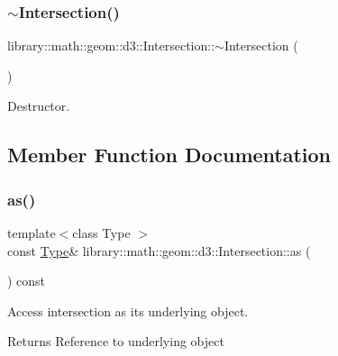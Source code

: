 \subsubsection{\texorpdfstring{$\sim$\+Intersection()}{~Intersection()}}
{\footnotesize\ttfamily library\+::math\+::geom\+::d3\+::\+Intersection\+::$\sim$\+Intersection (\begin{DoxyParamCaption}{ }\end{DoxyParamCaption})}



Destructor. 



\subsection{Member Function Documentation}
\mbox{\label{classlibrary_1_1math_1_1geom_1_1d3_1_1_intersection_a018842f95665de8a388f0b7cd48410a6}} 
\subsubsection{\texorpdfstring{as()}{as()}}
{\footnotesize\ttfamily template$<$class Type $>$ \\
const \hyperlink{classlibrary_1_1math_1_1geom_1_1d3_1_1_intersection_a3465d607fd42380f350598e055271b05}{Type}\& library\+::math\+::geom\+::d3\+::\+Intersection\+::as (\begin{DoxyParamCaption}{ }\end{DoxyParamCaption}) const\hspace{0.3cm}{\ttfamily [inline]}}



Access intersection as its underlying object. 

\begin{DoxyReturn}{Returns}
Reference to underlying object 
\end{DoxyReturn}
\mbox{\label{classlibrary_1_1math_1_1geom_1_1d3_1_1_intersection_af0f1aed5c97a5142a4b20cb8edcb78e0}} 
